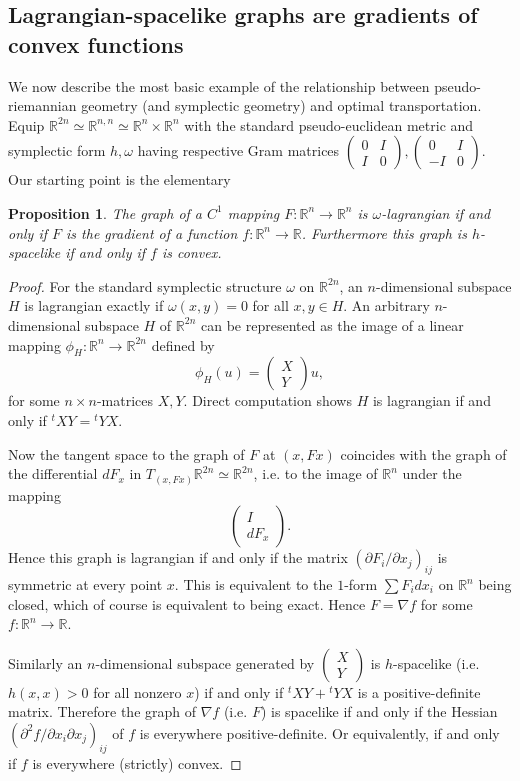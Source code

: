 \documentclass[12pt]{amsart}
\newtheorem{prop}[thm]{Proposition}
\theoremstyle{definition}
\theoremstyle{remark}
\newcommand{\bR}{\mathbb{R}}
\newcommand{\del}{\partial}
\begin{document}
\subsection{Lagrangian-spacelike graphs are gradients of convex functions}
We now describe the most basic example of the relationship between pseudo-riemannian geometry (and symplectic geometry) and optimal transportation. Equip $\bR^{2n} \simeq \bR^{n,n} \simeq \bR^n \times \bR^n$ with the standard pseudo-euclidean metric and symplectic form $h,\omega$ having respective Gram matrices $\begin{pmatrix} 0 & I \\ I & 0\end{pmatrix}, \begin{pmatrix} 0 & I \\ -I & 0\end{pmatrix}.$ Our starting point is the elementary

\begin{prop} The graph of a $C^1$ mapping $F:\bR^n \to \bR^n$ is $\omega$-lagrangian if and only if $F$ is the gradient of a function $f:\bR^n \to \bR$. Furthermore this graph is $h$-spacelike if and only if $f$ is convex. 
\end{prop}
\begin{proof}
For the standard symplectic structure $\omega$ on $\bR^{2n}$, an $n$-dimensional subspace $H$ is lagrangian exactly if $\omega(x,y)=0$ for all $x,y\in H$. An arbitrary $n$-dimensional subspace $H$ of $\bR^{2n}$ can be represented as the image of a linear mapping $\phi_H:\bR^n \to \bR^{2n}$ defined by $$\phi_H(u)=\begin{pmatrix} X \\ Y  \end{pmatrix}u, $$ for some $n\times n$-matrices $X,Y$. Direct computation shows $H$ is lagrangian if and only if ${}^tXY={}^tYX$. 

Now the tangent space to the graph of $F$ at $(x, Fx)$ coincides with the graph of the differential $dF_x$ in $T_{(x,Fx)}\bR^{2n} \simeq \bR^{2n}$, i.e. to the image of $\bR^n$ under the mapping $$\begin{pmatrix} I \\ dF_x \end{pmatrix}.$$ Hence this graph is lagrangian if and only if the matrix $(\del F_i / \del x_j)_{ij}$ is symmetric at every point $x$. This is equivalent to the $1$-form $\sum F_i dx_i$ on $\bR^n$ being closed, which of course is equivalent to being exact. Hence $F=\nabla f$ for some $f:\bR^n \to \bR$. 

Similarly an $n$-dimensional subspace generated by $\begin{pmatrix} X \\ Y  \end{pmatrix}$ is $h$-spacelike (i.e. $h(x,x)>0$ for all nonzero $x$) if and only if ${}^tXY +{}^tYX$ is a positive-definite matrix. Therefore the graph of $\nabla f$ (i.e. $F$) is spacelike if and only if the Hessian $(\del^2 f / \del x_i \del x_j)_{ij}$ of $f$ is everywhere positive-definite. Or equivalently, if and only if $f$ is everywhere (strictly) convex. 
\end{proof}
\end{document}
